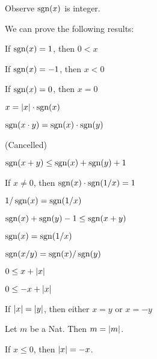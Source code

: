 \documentclass{article}
\begin{document}
Observe $\operatorname{sgn}(x)$ is integer.

We can prove the following results:
\begin{thm}
\item\label{absvalue:14} If $\operatorname{sgn}(x)=1$, then $0<x$
\item\label{absvalue:15} If $\operatorname{sgn}(x)=-1$, then $x<0$
\item\label{absvalue:16} If $\operatorname{sgn}(x)=0$, then $x=0$
\item\label{absvalue:17} $x=\lvert x\rvert\cdot\operatorname{sgn}(x)$
\item\label{absvalue:18} $\operatorname{sgn}(x\cdot y)=\operatorname{sgn}(x)\cdot\operatorname{sgn}(y)$
\item\label{absvalue:19} (Cancelled)
\item\label{absvalue:20} $\operatorname{sgn}(x+y)\leq\operatorname{sgn}(x)+\operatorname{sgn}(y)+1$
\item\label{absvalue:21} If $x\neq0$, then $\operatorname{sgn}(x)\cdot\operatorname{sgn}(1/x)=1$
\item\label{absvalue:22} $1/\operatorname{sgn}(x)=\operatorname{sgn}(1/x)$
\item\label{absvalue:23} $\operatorname{sgn}(x)+\operatorname{sgn}(y)-1\leq\operatorname{sgn}(x+y)$
\item\label{absvalue:24} $\operatorname{sgn}(x)=\operatorname{sgn}(1/x)$
\item\label{absvalue:25} $\operatorname{sgn}(x/y)=\operatorname{sgn}(x)/\operatorname{sgn}(y)$
\item\label{absvalue:26} $0\leq x+\lvert x\rvert$
\item\label{absvalue:27} $0\leq-x+\lvert x\rvert$
\item\label{absvalue:28} If $\lvert x\rvert=\lvert y\rvert$, then either $x=y$ or $x=-y$
\item\label{absvalue:29} Let $m$ be a Nat. Then $m=\lvert m\rvert$.
\item\label{absvalue:30} If $x\leq0$, then $\lvert x\rvert=-x$.
\end{thm}
\end{document}

